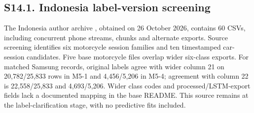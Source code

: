 \subsection*{S14.1. Indonesia label-version screening}
The Indonesia author archive \citep{indonesia2021}, obtained on 26 October 2026, contains 60 CSVs, including concurrent phone streams, chunks and alternate exports. Source screening identifies six motorcycle session families and ten timestamped car-session candidates. Five base motorcycle files overlap wider six-class exports. For matched Samsung records, original labels agree with wider column 21 on 20,782/25,833 rows in M5-1 and 4,456/5,206 in M5-4; agreement with column 22 is 22,558/25,833 and 4,693/5,206. Wider class codes and processed/LSTM-export fields lack a documented mapping in the base README. This source remains at the label-clarification stage, with no predictive fits included.

